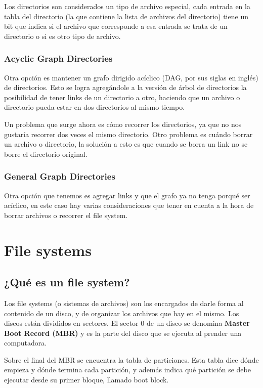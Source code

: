 \documentclass{article}
\begin{document}
Los directorios son considerados un tipo de archivo especial, cada entrada en la tabla del directorio (la que contiene la lista de archivos del directorio) tiene un bit que indica si el archivo que corresponde a esa entrada se trata de un directorio o si es otro tipo de archivo.

\subsubsection{Acyclic Graph Directories}

Otra opci\'on es mantener un grafo dirigido ac\'iclico (DAG, por sus siglas en ingl\'es) de directorios. Esto se logra agreg\'andole a la versi\'on de \'arbol de directorios la posibilidad de tener links de un directorio a otro, haciendo que un archivo o directorio pueda estar en dos directorios al mismo tiempo.

Un problema que surge ahora es c\'omo recorrer los directorios, ya que no nos gustar\'ia recorrer dos veces el mismo directorio. Otro problema es cu\'ando borrar un archivo o directorio, la soluci\'on a esto es que cuando se borra un link no se borre el directorio original.

\subsubsection{General Graph Directories}

Otra opci\'on que tenemos es agregar links y que el grafo ya no tenga porqu\'e ser ac\'iclico, en este caso hay varias consideraciones que tener en cuenta a la hora de borrar archivos o recorrer el file system.

\section{File systems}

\subsection{¿Qu\'e es un file system?}

Los file systems (o sistemas de archivos) son los encargados de darle forma al contenido de un disco, y de organizar los archivos que hay en el mismo. Los discos est\'an divididos en sectores. El sector 0 de un disco se denomina \textbf{Master Boot Record (MBR)} y es la parte del disco que se ejecuta al prender una computadora.

Sobre el final del MBR se encuentra la tabla de particiones. Esta tabla dice d\'onde empieza y d\'onde termina cada partici\'on, y adem\'as indica qu\'e partici\'on se debe ejecutar desde su primer bloque, llamado boot block.
\end{document}
